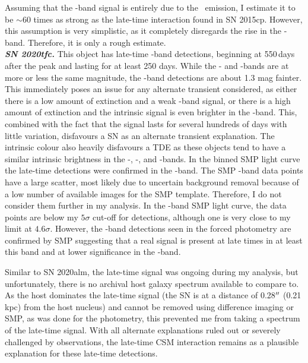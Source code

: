 \documentclass[a4paper,oneside,12pt, class=Latex/Classes/PhDthesisPSnPDF, crop=false]{standalone}
\begin{document}
Assuming that the \ztfr-band signal is entirely due to the \Halpha~emission, I estimate it to be $\sim60$ times as strong as the late-time interaction found in SN 2015cp. However, this assumption is very simplistic, as it completely disregards the rise in the \ztfi-band. Therefore, it is only a rough estimate.\\


\textit{\textbf{SN 2020tfc.}}
This object has late-time \ztfg\ztfr\ztfi-band detections, beginning at 550\,days after the peak and lasting for at least 250 days. While the \ztfr- and \ztfi-bands are at more or less the same magnitude, the \ztfg-band detections are about 1.3 mag fainter. This immediately poses an issue for any alternate transient considered, as either there is a low amount of extinction and a weak \ztfg-band signal, or there is a high amount of extinction and the intrinsic signal is even brighter in the \ztfi-band. This, combined with the fact that the signal lasts for several hundreds of days with little variation, disfavours a SN as an alternate transient explanation. The intrinsic colour also heavily disfavours a TDE as these objects tend to have a similar intrinsic brightness in the \ztfg-, \ztfr-, and \ztfi-bands. In the binned SMP light curve the late-time detections were confirmed in the \ztfg-band. The SMP \ztfi-band data points have a large scatter, most likely due to uncertain background removal because of a low number of available images for the SMP template. Therefore, I do not consider them further in my analysis. In the \ztfr-band SMP light curve, the data points are below my $5\sigma$ cut-off for detections, although one is very close to my limit at $4.6\sigma$. However, the \ztfg-band detections seen in the forced photometry are confirmed by SMP suggesting that a real signal is present at late times in at least this band and at lower significance in the \ztfr-band.

Similar to SN 2020alm, the late-time signal was ongoing during my analysis, but unfortunately, there is no archival host galaxy spectrum available to compare to. As the host dominates the late-time signal (the SN is at a distance of 0.28$^{\prime\prime}$ (0.21 kpc) from the host nucleus) and cannot be removed using difference imaging or SMP, as was done for the photometry, this prevented me from taking a spectrum of the late-time signal. With all alternate explanations ruled out or severely challenged by observations, the late-time CSM interaction remains as a plausible explanation for these late-time detections.
\end{document}
